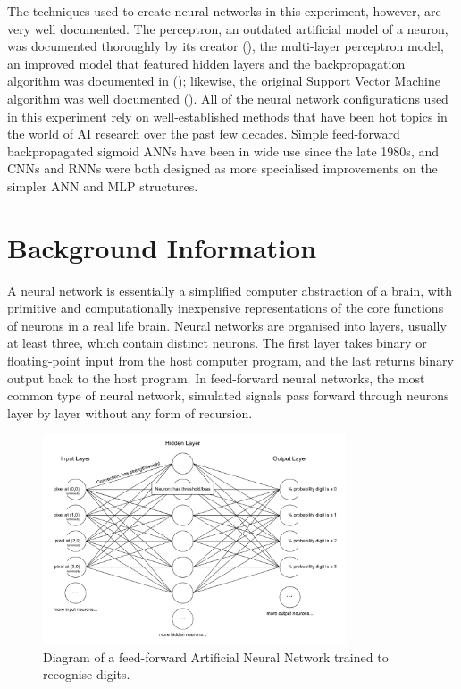 \documentclass[]{report}
\begin{document}
The techniques used to create neural networks in this experiment, however, are very well documented. The perceptron, an outdated artificial model of a neuron, was documented thoroughly by its creator (\cite{rosenblatt1958perceptron}), the multi-layer perceptron model, an improved model that featured hidden layers and the backpropagation algorithm was documented in (\cite{rumelhart1986learning}); likewise, the original Support Vector Machine algorithm was well documented (\cite{vapnik1995support}). All of the neural network configurations used in this experiment rely on well-established methods that have been hot topics in the world of AI research over the past few decades. Simple feed-forward backpropagated sigmoid ANNs have been in wide use since the late 1980s, and CNNs and RNNs were both designed as more specialised improvements on the simpler ANN and MLP structures.

\section{Background Information}

A neural network is essentially a simplified computer abstraction of a brain, with primitive and computationally inexpensive representations of the core functions of neurons in a real life brain. Neural networks are organised into layers, usually at least three, which contain distinct neurons. The first layer takes binary or floating-point input from the host computer program, and the last returns binary output back to the host program. In feed-forward neural networks, the most common type of neural network, simulated signals pass forward through neurons layer by layer without any form of recursion.

\begin{figure}[H]
\centering
\includegraphics[width=0.8\textwidth]{network.png}
\caption{Diagram of a feed-forward Artificial Neural Network trained to recognise digits.}
\label{fig:network}
\end{figure}
\end{document}
